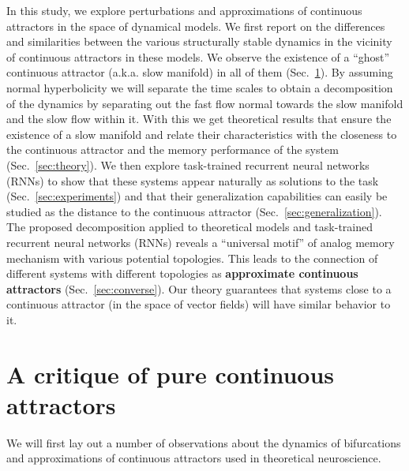 \documentclass{article} %
\newcounter{ct}
\theoremstyle{definition}
\theoremstyle{remark}
\begin{document}
In this study, we explore perturbations and approximations of continuous attractors in the space of dynamical models.
We first report on the differences and similarities between the various structurally stable dynamics in the vicinity of continuous attractors in these models.
We observe the existence of a ``ghost'' continuous attractor (a.k.a. slow manifold) in all of them (Sec.~\ref{sec:critique}).
By assuming normal hyperbolicity we will separate the time scales to obtain a decomposition of the dynamics by separating out the fast flow normal towards the slow manifold and the slow flow within it.
With this we get theoretical results that ensure the existence of a slow manifold and relate their characteristics with the closeness to the continuous attractor and the memory performance of the system (Sec.~\ref{sec:theory}). 
We then explore task-trained recurrent neural networks (RNNs) to show that these systems appear naturally as solutions to the task (Sec.~\ref{sec:experiments}) and that their generalization capabilities can easily be studied as the distance to the continuous attractor (Sec.~\ref{sec:generalization}).
The proposed decomposition applied to theoretical models and task-trained recurrent neural networks (RNNs) reveals a ``universal motif'' of analog memory mechanism with various potential topologies. 
This leads to the connection of different systems with different topologies as \textbf{approximate continuous attractors} (Sec.~\ref{sec:converse}).
Our theory guarantees that systems close to a continuous attractor (in the space of vector fields) will have similar behavior to it.


\section{A critique of pure continuous attractors}\label{sec:critique}
We will first lay out a number of observations about the dynamics of bifurcations and approximations of continuous attractors used in theoretical neuroscience.
\end{document}
